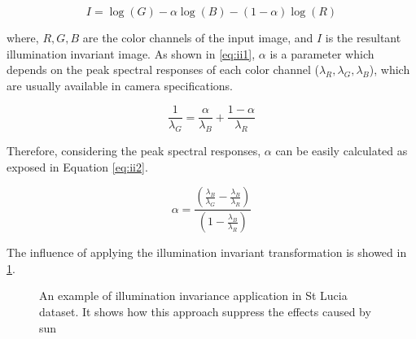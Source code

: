 \begin{equation}
I=\log(G)-\alpha\log(B)-(1-\alpha)\log(R)
\label{eq:iifinal}
\end{equation}

where, $R, G, B$ are the color channels of the input image, and $I$ is the resultant illumination invariant image. As shown in \ref{eq:ii1}, $\alpha$ is a parameter which depends on the peak spectral responses of each color channel ($\lambda_R, \lambda_G, \lambda_B$), which are usually available in camera specifications.

\begin{equation}
\frac{1}{\lambda_G}=\frac{\alpha}{\lambda_B}+\frac{1-\alpha}{\lambda_R}
\label{eq:ii1}
\end{equation}

Therefore, considering the peak spectral responses, $\alpha$ can be easily calculated as exposed in Equation \ref{eq:ii2}.

\begin{equation}
\alpha=\frac{(\frac{\lambda_B}{\lambda_G}-\frac{\lambda_B}{\lambda_R})}{(1-\frac{\lambda_B}{\lambda_R})}
\label{eq:ii2}
\end{equation}
 
The influence of applying the illumination invariant transformation is showed in \ref{fig:iicompare1}.

\begin{figure}
	\centering
	\caption{An example of illumination invariance application in St Lucia dataset. It shows how this approach suppress the effects caused by sun}
	\label{fig:iicompare1}
\end{figure}

